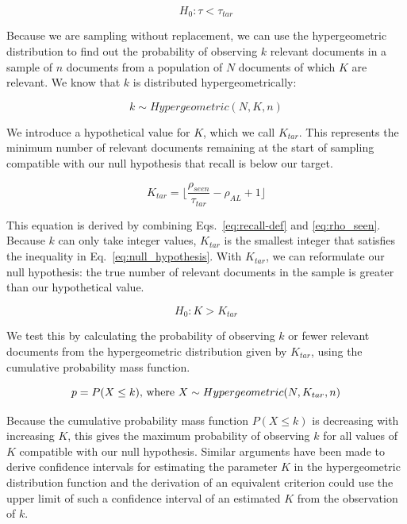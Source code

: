 \documentclass{bmcart}
\begin{document}
	\begin{equation}
	H_0 : \tau < \tau_{tar}
	\label{eq:null_hypothesis}
	\end{equation}
	
	Because we are sampling without replacement, we can use the hypergeometric distribution to find out the probability of observing $k$ relevant documents in a sample of $n$ documents from a population of $N$ documents of which $K$ are relevant. We know that $k$ is distributed hypergeometrically:
	
	\begin{equation}
	k \sim Hypergeometric(N, K, n)
	\end{equation}
	
	We introduce a hypothetical value for $K$, which we call $K_{tar}$. This represents the minimum number of relevant documents remaining at the start of sampling compatible with our null hypothesis that recall is below our target.
	
	\begin{equation}
	K_{tar} = \lfloor \frac{\rho_{seen}}{\tau_{tar}}-\rho_{AL}+1 \rfloor
	\end{equation}
	
	This equation is derived by combining Eqs.~\ref{eq:recall-def} and \ref{eq:rho_seen}. Because $k$ can only take integer values, $K_{tar}$ is the smallest integer that satisfies the inequality in Eq.~\ref{eq:null_hypothesis}.
	With $K_{tar}$, we can reformulate our null hypothesis: the true number of relevant documents in the sample is greater than our hypothetical value.
	
	\begin{equation}
	H_0 : K > K_{tar}
	\end{equation}
	
	We test this by calculating the probability of observing $k$ or fewer relevant documents from the hypergeometric distribution given by $K_{tar}$, using the cumulative probability mass function.
	
	\begin{equation}
	p = P(X \leq k)$, where $X \sim Hypergeometric(N,K_{tar},n)
	\label{eq:p-value}
	\end{equation}
	
	Because the cumulative probability mass function $P(X \leq k)$ is decreasing with increasing $K$, this gives the maximum probability of observing $k$ for all values of $K$ compatible with our null hypothesis. Similar arguments have been made to derive confidence intervals for estimating the parameter $K$ in the hypergeometric distribution function \citep{Buonaccorsi1987, Sahai1995} and the derivation of an equivalent criterion could use the upper limit of such a confidence interval of an estimated $K$ from the observation of $k$.
	
\end{document}
